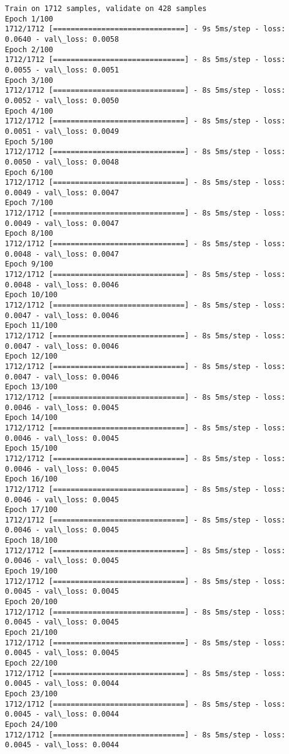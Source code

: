 \documentclass[11pt]{article}
\begin{document}
    \begin{Verbatim}[commandchars=\\\{\}]
Train on 1712 samples, validate on 428 samples
Epoch 1/100
1712/1712 [==============================] - 9s 5ms/step - loss: 0.0640 - val\_loss: 0.0058
Epoch 2/100
1712/1712 [==============================] - 8s 5ms/step - loss: 0.0055 - val\_loss: 0.0051
Epoch 3/100
1712/1712 [==============================] - 8s 5ms/step - loss: 0.0052 - val\_loss: 0.0050
Epoch 4/100
1712/1712 [==============================] - 8s 5ms/step - loss: 0.0051 - val\_loss: 0.0049
Epoch 5/100
1712/1712 [==============================] - 8s 5ms/step - loss: 0.0050 - val\_loss: 0.0048
Epoch 6/100
1712/1712 [==============================] - 8s 5ms/step - loss: 0.0049 - val\_loss: 0.0047
Epoch 7/100
1712/1712 [==============================] - 8s 5ms/step - loss: 0.0049 - val\_loss: 0.0047
Epoch 8/100
1712/1712 [==============================] - 8s 5ms/step - loss: 0.0048 - val\_loss: 0.0047
Epoch 9/100
1712/1712 [==============================] - 8s 5ms/step - loss: 0.0048 - val\_loss: 0.0046
Epoch 10/100
1712/1712 [==============================] - 8s 5ms/step - loss: 0.0047 - val\_loss: 0.0046
Epoch 11/100
1712/1712 [==============================] - 8s 5ms/step - loss: 0.0047 - val\_loss: 0.0046
Epoch 12/100
1712/1712 [==============================] - 8s 5ms/step - loss: 0.0047 - val\_loss: 0.0046
Epoch 13/100
1712/1712 [==============================] - 8s 5ms/step - loss: 0.0046 - val\_loss: 0.0045
Epoch 14/100
1712/1712 [==============================] - 8s 5ms/step - loss: 0.0046 - val\_loss: 0.0045
Epoch 15/100
1712/1712 [==============================] - 8s 5ms/step - loss: 0.0046 - val\_loss: 0.0045
Epoch 16/100
1712/1712 [==============================] - 8s 5ms/step - loss: 0.0046 - val\_loss: 0.0045
Epoch 17/100
1712/1712 [==============================] - 8s 5ms/step - loss: 0.0046 - val\_loss: 0.0045
Epoch 18/100
1712/1712 [==============================] - 8s 5ms/step - loss: 0.0046 - val\_loss: 0.0045
Epoch 19/100
1712/1712 [==============================] - 8s 5ms/step - loss: 0.0045 - val\_loss: 0.0045
Epoch 20/100
1712/1712 [==============================] - 8s 5ms/step - loss: 0.0045 - val\_loss: 0.0045
Epoch 21/100
1712/1712 [==============================] - 8s 5ms/step - loss: 0.0045 - val\_loss: 0.0045
Epoch 22/100
1712/1712 [==============================] - 8s 5ms/step - loss: 0.0045 - val\_loss: 0.0044
Epoch 23/100
1712/1712 [==============================] - 8s 5ms/step - loss: 0.0045 - val\_loss: 0.0044
Epoch 24/100
1712/1712 [==============================] - 8s 5ms/step - loss: 0.0045 - val\_loss: 0.0044

\end{Verbatim}
\end{document}

